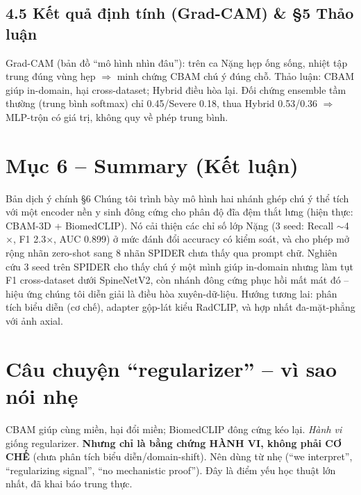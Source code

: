 \documentclass[12pt,a4paper]{article}
\begin{document}
\subsection{4.5 Kết quả định tính (Grad-CAM) \& §5 Thảo luận}
Grad-CAM (bản đồ ``mô hình nhìn đâu''): trên ca Nặng hẹp ống sống, nhiệt tập trung đúng vùng hẹp $\Rightarrow$ minh chứng CBAM chú ý đúng chỗ. Thảo luận: CBAM giúp in-domain, hại cross-dataset; Hybrid điều hòa lại. Đối chứng ensemble tầm thường (trung bình softmax) chỉ 0.45/Severe 0.18, thua Hybrid 0.53/0.36 $\Rightarrow$ MLP-trộn có giá trị, không quy về phép trung bình.

\section{Mục 6 -- Summary (Kết luận)}
\begin{dichbox}{Bản dịch ý chính §6}
Chúng tôi trình bày mô hình hai nhánh ghép chú ý thể tích với một encoder nền y sinh đông cứng cho phân độ đĩa đệm thắt lưng (hiện thực: CBAM-3D + BiomedCLIP). Nó cải thiện các chỉ số lớp Nặng (3 seed: Recall $\sim$4$\times$, F1 2.3$\times$, AUC 0.899) ở mức đánh đổi accuracy có kiểm soát, và cho phép mở rộng nhãn zero-shot sang 8 nhãn SPIDER chưa thấy qua prompt chữ. Nghiên cứu 3 seed trên SPIDER cho thấy chú ý một mình giúp in-domain nhưng làm tụt F1 cross-dataset dưới SpineNetV2, còn nhánh đông cứng phục hồi mất mát đó -- hiệu ứng chúng tôi diễn giải là điều hòa xuyên-dữ-liệu. Hướng tương lai: phân tích biểu diễn (cơ chế), adapter gộp-lát kiểu RadCLIP, và hợp nhất đa-mặt-phẳng với ảnh axial.
\end{dichbox}

\section{Câu chuyện ``regularizer'' -- vì sao nói nhẹ}
CBAM giúp cùng miền, hại đổi miền; BiomedCLIP đông cứng kéo lại. \emph{Hành vi} giống regularizer. \textbf{Nhưng chỉ là bằng chứng HÀNH VI, không phải CƠ CHẾ} (chưa phân tích biểu diễn/domain-shift). Nên dùng từ nhẹ (``we interpret'', ``regularizing signal'', ``no mechanistic proof''). Đây là điểm yếu học thuật lớn nhất, đã khai báo trung thực.

\end{document}
